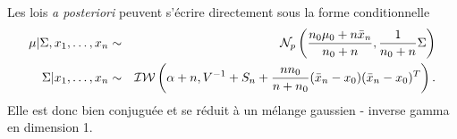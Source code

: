 \begin{rep} %
Les lois {\it a posteriori} peuvent s'écrire directement sous la forme conditionnelle
\begin{eqnarray*}
\mu|\Sigma,x_1,\ldots,x_n & \sim & {\cal{N}}_p\left( \frac{n_0 \mu_0 + n \bar{x}_n}{n_0 + n}, \frac{1}{n_0+n} \Sigma\right) \\
\Sigma| x_1,\ldots,x_n & \sim & {\cal{IW}}\left(\alpha + n, V^{-1} + S_n + \frac{nn_0}{n+n_0} (\bar{x}_n-x_0)(\bar{x}_n-x_0)^T\right).
\end{eqnarray*}
Elle est donc bien conjuguée et se réduit à un mélange gaussien - inverse gamma en dimension 1.
\end{rep}